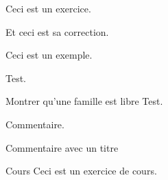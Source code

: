     \begin{latexcode}
        \begin{exercise}{}{}
            Ceci est un exercice.
        \end{exercise}
    \end{latexcode}

    \begin{latexcode}
        \begin{correction}
            Et ceci est sa correction.
        \end{correction}
    \end{latexcode}

    \begin{latexcode}
        \begin{example}
            Ceci est un exemple.
        \end{example}
    \end{latexcode}

    \begin{latexcode}
        \begin{remark}{}{}
            Test.
        \end{remark}
    \end{latexcode}

    \begin{latexcode}
        \begin{method}{Montrer qu'une famille est libre}{}
            Test.
        \end{method}
    \end{latexcode}

    \begin{latexcode}
        \begin{note}
            Commentaire.
        \end{note}
    \end{latexcode}

    \begin{latexcode}
        \begin{note}[Note]
            Commentaire avec un titre
        \end{note}
    \end{latexcode}

    \begin{latexcode}
        \begin{subject}{}{}
            \begin{subjectexercise}{Cours}{}
                Ceci est un exercice de cours.
            \end{subjectexercise}
        \end{subject}
    \end{latexcode}
